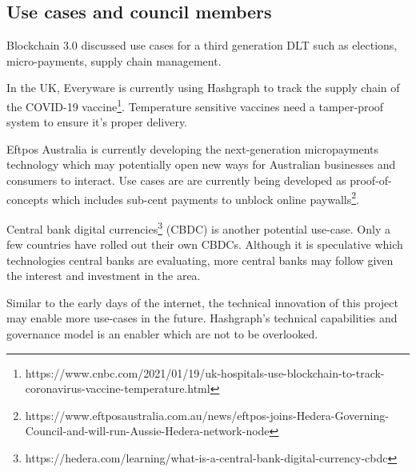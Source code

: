 \subsection{Use cases and council members}

Blockchain 3.0\cite{maesa2020blockchain} discussed use cases for a third generation DLT such as elections, micro-payments, supply chain management.

In the UK, Everyware is currently using Hashgraph to track the supply chain of the COVID-19 vaccine\footnote{https://www.cnbc.com/2021/01/19/uk-hospitals-use-blockchain-to-track-coronavirus-vaccine-temperature.html}. Temperature sensitive vaccines need a tamper-proof system to ensure it's proper delivery.

Eftpos Australia is currently developing the next-generation micropayments technology which may potentially open new ways for Australian businesses and consumers to interact. Use cases are are currently being developed as proof-of-concepts which includes sub-cent payments to unblock online paywalls\footnote{https://www.eftposaustralia.com.au/news/eftpos-joins-Hedera-Governing-Council-and-will-run-Aussie-Hedera-network-node}.

Central bank digital currencies\footnote{https://hedera.com/learning/what-is-a-central-bank-digital-currency-cbdc} (CBDC) is another potential use-case. Only a few countries have rolled out their own CBDCs. Although it is speculative which technologies central banks are evaluating, more central banks may follow given the interest and investment in the area. 

Similar to the early days of the internet, the technical innovation of this project may enable more use-cases in the future. Hashgraph's technical capabilities and governance model is an enabler which are not to be overlooked.




